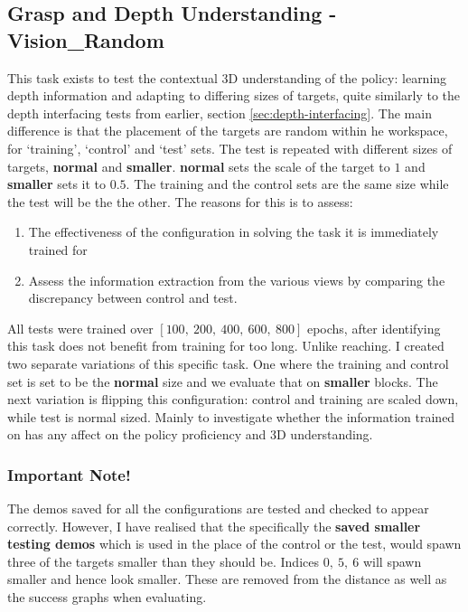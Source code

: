 \subsection{Grasp and Depth Understanding - \textbf{Vision\_Random}}
This task exists to test the contextual 3D understanding of the policy: learning depth information and adapting to differing sizes of targets, quite similarly to the depth interfacing tests from earlier, section \ref{sec:depth-interfacing}. The main difference is that the placement of the targets are random within he workspace, for `training', `control' and `test' sets. The test is repeated with different sizes of targets, \textbf{normal} and \textbf{smaller}. \textbf{normal} sets the scale of the target to $1$ and \textbf{smaller} sets it to $0.5$. The training and the control sets are the same size while the test will be the the other. The reasons for this is to assess:
\begin{enumerate}
  \itemsep0em
  \item The effectiveness of the configuration in solving the task it is immediately trained for
  \item Assess the information extraction from the various views by comparing the discrepancy between control and test.
\end{enumerate}

All tests were trained over \(\left[ 100, ~200, ~400, ~600, ~800\right]\) epochs, after identifying this task does not benefit from training for too long. Unlike reaching. I created two separate variations of this specific task. One where the training and control set is set to be the \textbf{normal} size and we evaluate that on \textbf{smaller} blocks. The next variation is flipping this configuration: control and training are scaled down, while test is normal sized. Mainly to investigate whether the information trained on has any affect on the policy proficiency and 3D understanding.

\subsubsection{Important Note!}
The demos saved for all the configurations are tested and checked to appear correctly. However, I have realised that the specifically the \textbf{saved smaller testing demos} which is used in the place of the control or the test, would spawn three of the targets smaller than they should be. Indices  \(0, ~5, ~6\)  will spawn smaller and hence look smaller. These are removed from the distance as well as the success graphs when evaluating.

